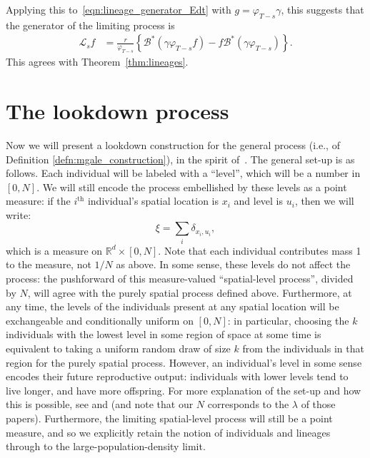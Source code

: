 \documentclass[12pt]{article}
\newcommand{\IR}{\mathbb R}
\newcommand{\DG}{\mathcal{B}}  %
\newcommand{\Lgen}{\mathcal{L}}    %
\newcommand{\lp}{\xi}              %
\begin{document}
Applying this to~\eqref{eqn:lineage_generator_Edt} with $g = \varphi_{T-s} \gamma$,
this suggests that the generator of the limiting process is
\begin{align} \label{eqn:heuristic_lineage_generator}
    \Lgen_s f
    &=
    \frac{r}{\varphi_{T-s}}
    \left\{
        \DG^*(\gamma \varphi_{T-s} f) - f \DG^*(\gamma \varphi_{T-s})
    \right\} .
\end{align}
This agrees with Theorem~\ref{thm:lineages}.


\section{The lookdown process}
    \label{sec:lookdown}


Now we will present a lookdown construction for the general process
(i.e., of Definition \ref{defn:mgale_construction}),
in the spirit of~\cite{kurtz/rodrigues:2011}. 
The general set-up is as follows.
Each individual will be labeled with a ``level'',
which will be a number in $[0, N]$.
We will still encode the process embellished by these levels
as a point measure:
if the $i^\mathrm{th}$ individual's spatial location is $x_i$
and level is $u_i$, then we will write:
$$
    \lp = \sum_i \delta_{x_i, u_i} ,
$$
which is a measure on $\IR^d \times [0, N]$.
Note that each individual contributes mass 1 to the measure,
not $1/N$ as above.
In some sense, these levels do not affect the process:
the pushforward of this measure-valued ``spatial-level process'',
divided by $N$,
will agree with the purely spatial process defined above.
Furthermore, at any time, the levels of the individuals present at any spatial location
will be exchangeable and conditionally uniform on $[0, N]$:
in particular, choosing the $k$ individuals with the lowest level in some region of space
at some time is equivalent to taking a uniform random draw of size $k$ from the individuals in that region
for the purely spatial process.
However, an individual's level in some sense encodes their future reproductive output:
individuals with lower levels tend to live longer, and have more offspring.
For more explanation of the set-up and how this is possible,
see \citet{etheridge/kurtz:2018} and \citet{kurtz/rodrigues:2011}
(and note that our $N$ corresponds to the $\lambda$ of those papers).
Furthermore, the limiting spatial-level process will still be a point measure,
and so we explicitly retain the notion of individuals and lineages through to the 
large-population-density limit.
\end{document}
